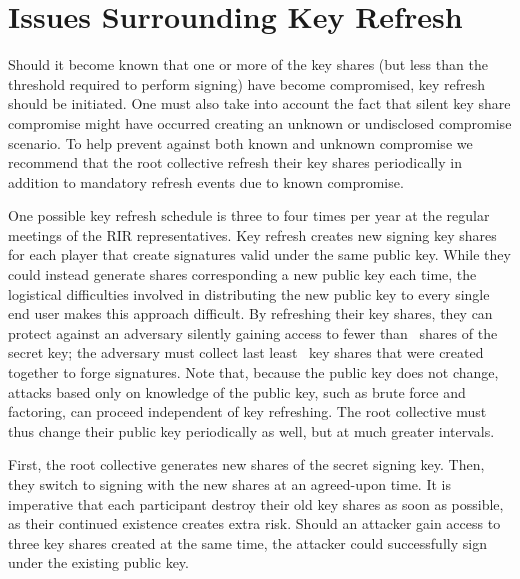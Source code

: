 \section{Issues Surrounding Key Refresh}
\label{sec:refresh}

Should it become known that one or more of the key shares (but less
than the threshold required to perform signing) have become
compromised, key refresh should be initiated. One must also take into
account the fact that silent key share compromise might have occurred
creating an unknown or undisclosed compromise scenario. To help
prevent against both known and unknown compromise we recommend that
the root collective refresh their key shares periodically in addition
to mandatory refresh events due to known compromise.

One possible key refresh schedule is three to four times per year at
the regular meetings of the RIR representatives. Key refresh creates
new signing key shares for each player that create signatures valid
under the same public key. While they could instead generate shares
corresponding a new public key each time, the logistical difficulties
involved in distributing the new public key to every single end user
makes this approach difficult. By refreshing their key shares, they
can protect against an adversary silently
 gaining access to fewer
than \nums\ shares of the secret key; the adversary must collect last
least \nums\ key shares that were created together to forge
signatures. Note that, because the public key does not change, attacks
based only on knowledge of the public key, such as brute force and
factoring, can proceed independent of key refreshing. The root
collective must thus change their public key periodically as well, but
at much greater intervals.

First, the root collective generates new shares of the secret signing
key. Then, they switch to signing with the new shares at an
agreed-upon time.  It is imperative that each participant destroy
their old key shares as soon as possible, as their continued existence
creates extra risk. Should an attacker gain access to three key shares
created at the same time, the attacker could successfully sign under
the existing public key.



